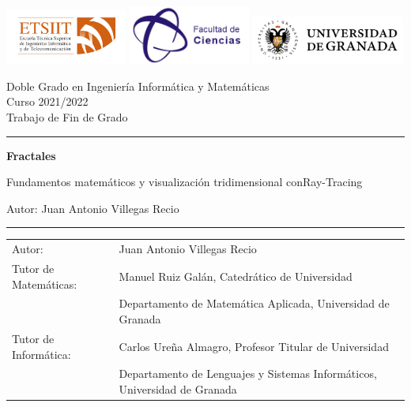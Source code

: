 \begin{titlepage}
    \hspace{-1.5cm}
	\includegraphics[width=40mm]{img/LogoETSIIT.png}
	\includegraphics[width=40mm]{img/LogoFacultadCiencias.jpeg}
	\hfill
	\includegraphics[width=50mm]{img/LogoUGR.png}
	
	\noindent\begin{small} \sffamily
		\begin{minipage}{0.65\textwidth}
			Doble Grado en Ingeniería Informática y Matemáticas\\
			Curso 2021/2022\\
			Trabajo de Fin de Grado\\
		\end{minipage}
	\hrule
	\end{small}

	\vspace{1cm}
	{\LARGE\noindent \textbf{Fractales} \par}
	\vspace{0.5cm}
	{\Large\noindent Fundamentos matemáticos y visualización tridimensional con\linebreak Ray-Tracing \par}
	\vspace{2cm}
	{\LARGE\noindent Autor: Juan Antonio Villegas Recio \par} 
	
	\vfill
		
	\hrule
	\vspace{0.3cm}
	
	\begin{table}[h!]
		\begin{footnotesize} \sffamily
			\begin{tabular}{p{}p{}}
				Autor: & Juan Antonio Villegas Recio \\
				Tutor de Matemáticas:    & Manuel Ruiz Galán, Catedrático de Universidad\\
				& Departamento de Matemática Aplicada, Universidad de Granada \\
				Tutor de Informática:      & Carlos Ureña Almagro, Profesor Titular de Universidad \\
				& Departamento de Lenguajes y Sistemas Informáticos, Universidad de Granada
			\end{tabular}
		\end{footnotesize}
	\end{table}
	
\end{titlepage}